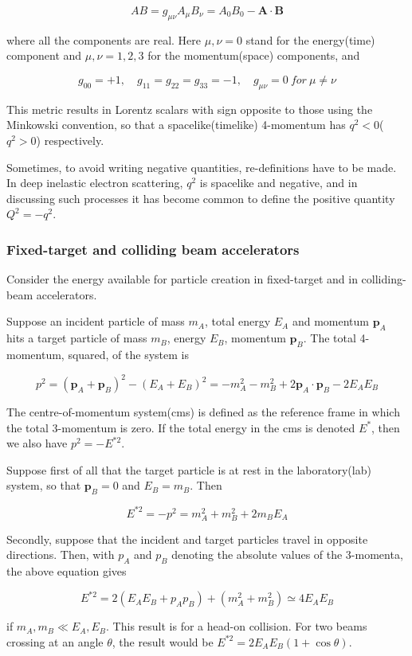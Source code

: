 \documentclass[en, device=normal]{elegantnote}
\begin{document}
$$AB=g_{\mu\nu}A_\mu B_\nu=A_0B_0-\textbf{A}\cdot\textbf{B}$$

where all the components are real. Here $\mu,\nu =0$ stand for the energy(time) component 
and $\mu,\nu=1,2,3$ for the momentum(space) components, and 

$$g_{00}=+1,\quad g_{11}=g_{22}=g_{33}=-1,\quad g_{\mu\nu}=0\ for\ \mu\neq\nu$$

This metric results in Lorentz scalars with sign opposite to those using the Minkowski 
convention, so that a spacelike(timelike) 4-momentum has $q^2<0$($q^2>0$) respectively.

Sometimes, to avoid writing negative quantities, re-definitions have to be made. In deep 
inelastic electron scattering, $q^2$ is spacelike and negative, and in discussing such 
processes it has become common to define the positive quantity $Q^2=-q^2$.

\subsubsection{Fixed-target and colliding beam accelerators}

Consider the energy available for particle creation in fixed-target and in colliding-beam 
accelerators.

Suppose an incident particle of mass $m_A$, total energy $E_A$ and momentum $\textbf{p}_A$ 
hits a target particle of mass $m_B$, energy $E_B$, momentum $\textbf{p}_B$. The total 
4-momentum, squared, of the system is 

$$p^2=(\textbf{p}_A+\textbf{p}_B)^2-(E_A+E_B)^2=-m_A^2-m_B^2+2\textbf{p}_A\cdot\textbf{p}_B-2E_AE_B$$

The centre-of-momentum system(cms) is defined as the reference frame in which the total 
3-momentum is zero. If the total energy in the cms is denoted $E^*$, then we also have $p^2=-E^{*2}$.

Suppose first of all that the target particle is at rest in the laboratory(lab) system, so that $\textbf{p}_B=0$ 
and $E_B=m_B$. Then 

$$E^{*2}=-p^2=m_A^2+m_B^2+2m_BE_A$$

Secondly, suppose that the incident and target particles travel in opposite directions. 
Then, with $p_A$ and $p_B$ denoting the absolute values of the 3-momenta, the above 
equation gives 

$$E^{*2}=2(E_AE_B+p_Ap_B)+(m_A^2+m_B^2)\simeq 4E_AE_B$$

if $m_A,m_B\ll E_A,E_B$. This result is for a head-on collision. For two beams crossing at an 
angle $\theta$, the result would be $E^{*2}=2E_AE_B(1+\cos\theta)$.
\end{document}
